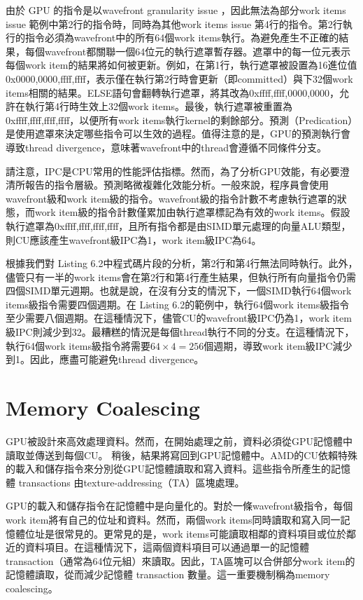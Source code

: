 由於 GPU 的指令是以wavefront granularity issue ，因此無法為部分work items issue 範例中第2行的指令時，同時為其他work items issue 第4行的指令。第2行執行的指令必須為wavefront中的所有64個work items執行。為避免產生不正確的結果，每個wavefront都關聯一個64位元的執行遮罩暫存器。遮罩中的每一位元表示每個work item的結果將如何被更新。例如，在第1行，執行遮罩被設置為16進位值0x0000,0000,ffff,ffff，表示僅在執行第2行時會更新（即committed）與下32個work items相關的結果。ELSE語句會翻轉執行遮罩，將其改為0xffff,ffff,0000,0000，允許在執行第4行時生效上32個work items。最後，執行遮罩被重置為0xffff,ffff,ffff,ffff，以便所有work items執行kernel的剩餘部分。預測（Predication）是使用遮罩來決定哪些指令可以生效的過程。值得注意的是，GPU的預測執行會導致thread divergence，意味著wavefront中的thread會遵循不同條件分支。

請注意，IPC是CPU常用的性能評估指標。然而，為了分析GPU效能，有必要澄清所報告的指令層級。預測略微複雜化效能分析。一般來說，程序員會使用wavefront級和work item級的指令。wavefront級的指令計數不考慮執行遮罩的狀態，而work item級的指令計數僅累加由執行遮罩標記為有效的work items。假設執行遮罩為0xffff,ffff,ffff,ffff，且所有指令都是由SIMD單元處理的向量ALU類型，則CU應該產生wavefront級IPC為1，work item級IPC為64。

根據我們對 Listing 6.2中程式碼片段的分析，第2行和第4行無法同時執行。此外，儘管只有一半的work items會在第2行和第4行產生結果，但執行所有向量指令仍需四個SIMD單元週期。也就是說，在沒有分支的情況下，一個SIMD執行64個work items級指令需要四個週期。在 Listing 6.2的範例中，執行64個work items級指令至少需要八個週期。在這種情況下，儘管CU的wavefront級IPC仍為1，work item級IPC則減少到32。最糟糕的情況是每個thread執行不同的分支。在這種情況下，執行64個work items級指令將需要$64 \times 4 = 256$個週期，導致work item級IPC減少到1。因此，應盡可能避免thread divergence。

\section{Memory Coalescing} \label{sec:memory_coalescing}
GPU被設計來高效處理資料。然而，在開始處理之前，資料必須從GPU記憶體中讀取並傳送到每個CU。
稍後，結果將寫回到GPU記憶體中。AMD的CU依賴特殊的載入和儲存指令來分別從GPU記憶體讀取和寫入資料。這些指令所產生的記憶體 transactions 由texture-addressing（TA）區塊處理。

GPU的載入和儲存指令在記憶體中是向量化的。對於一條wavefront級指令，每個work item將有自己的位址和資料。然而，兩個work items同時讀取和寫入同一記憶體位址是很常見的。更常見的是，work items可能讀取相鄰的資料項目或位於鄰近的資料項目。在這種情況下，這兩個資料項目可以通過單一的記憶體 transaction（通常為64位元組）來讀取。因此，TA區塊可以合併部分work item的記憶體讀取，從而減少記憶體 transaction 數量。這一重要機制稱為memory coalescing。

